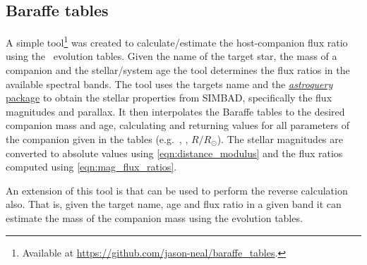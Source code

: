 \subsection{Baraffe tables}
\label{subsubsec:baraffe_tables_code}
A simple tool\footnote{Available at \href{https://github.com/jason-neal/baraffe_tables}{\url{https://github.com/jason-neal/baraffe\_tables}}.} was created to calculate/estimate the host-companion flux ratio using the~\citet{baraffe_evolutionary_2003, baraffe_new_2015} evolution tables.
Given the name of the target star, the mass of a companion and the stellar/system age the tool determines the flux ratios in the available spectral bands.
The tool uses the targets name and the \href{https://zenodo.org/record/1160627}{\emph{astroquery} package} to obtain the stellar properties from {SIMBAD}, specifically the flux magnitudes and parallax.
It then interpolates the Baraffe tables to the desired companion mass and age, calculating and returning values for all parameters of the companion given in the tables (e.g.\ \Teff{}, \Logg{}, \(R/R_{\odot}\)).
The stellar magnitudes are converted to absolute values using \cref{eqn:distance_modulus} and the flux ratios computed using \cref{eqn:mag_flux_ratios}.

An extension of this tool is that can be used to perform the reverse calculation also.
That is, given the target name, age and flux ratio in a given band it can estimate the mass of the companion mass using the evolution tables.
